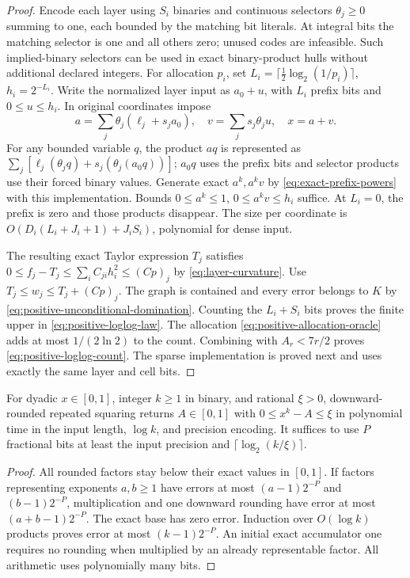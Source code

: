 \begin{proof}
Encode each layer using $S_i$ binaries and continuous selectors
$\theta_j\ge0$ summing to one, each bounded by the matching bit
literals. At integral bits the matching selector is one and all others
zero; unused codes are infeasible. Such implied-binary selectors can
be used in exact binary-product hulls without additional declared
integers. For allocation $p_i$, set
$L_i=\lceil\frac12\log_2(1/p_i)\rceil$, $h_i=2^{-L_i}$.
Write the normalized layer input as $a_0+u$, with $L_i$ prefix bits
and $0\le u\le h_i$. In original coordinates impose
\[
 a=\sum_j\theta_j(\ell_j+s_ja_0),\quad
 v=\sum_js_j\theta_ju,\quad x=a+v.
\]
For any bounded variable $q$, the product $aq$ is represented as
$\sum_j[\ell_j(\theta_jq)+s_j(\theta_j(a_0q))]$;
$a_0q$ uses the prefix bits and selector products use their forced
binary values. Generate exact $a^k,a^kv$ by
\eqref{eq:exact-prefix-powers} with this implementation. Bounds
$0\le a^k\le1$, $0\le a^kv\le h_i$ suffice. At $L_i=0$, the
prefix is zero and those products disappear. The size per coordinate
is $O(D_i(L_i+J_i+1)+J_iS_i)$, polynomial for dense input.

The resulting exact Taylor expression $T_j$ satisfies
$0\le f_j-T_j\le\sum_iC_{ji}h_i^2\le(Cp)_j$ by
\eqref{eq:layer-curvature}. Use $T_j\le w_j\le T_j+(Cp)_j$.
The graph is contained and every error belongs to $K$ by
\eqref{eq:positive-unconditional-domination}. Counting the $L_i+S_i$ bits
proves the finite upper in \eqref{eq:positive-loglog-law}.
The allocation \eqref{eq:positive-allocation-oracle} adds at most
$1/(2\ln2)$ to the count. Combining with $A_r<7r/2$ proves
\eqref{eq:positive-loglog-count}. The sparse implementation is proved
next and uses exactly the same layer and cell bits.
\end{proof}

\begin{lemma}\label{lem:binary-power-evaluation}
For dyadic $x\in[0,1]$, integer $k\ge1$ in binary, and rational
$\xi>0$, downward-rounded repeated squaring returns $A\in[0,1]$
with $0\le x^k-A\le\xi$ in polynomial time in the input length,
$\log k$, and precision encoding. It suffices to use $P$ fractional
bits at least the input precision and $\lceil\log_2(k/\xi)\rceil$.
\end{lemma}
\begin{proof}
All rounded factors stay below their exact values in $[0,1]$.
If factors representing exponents $a,b\ge1$ have errors at most
$(a-1)2^{-P}$ and $(b-1)2^{-P}$, multiplication and one downward
rounding have error at most $(a+b-1)2^{-P}$. The exact base has zero
error. Induction over $O(\log k)$ products proves error at most
$(k-1)2^{-P}$. An initial exact accumulator one requires no rounding
when multiplied by an already representable factor. All arithmetic
uses polynomially many bits.
\end{proof}

